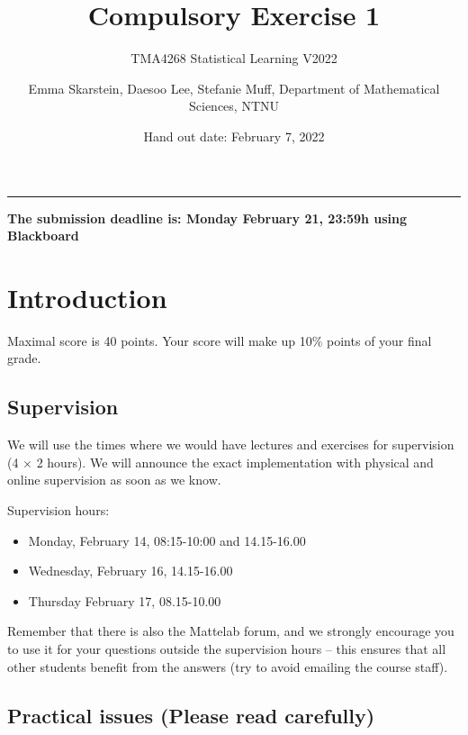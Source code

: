 \documentclass[
]{article}
\title{Compulsory Exercise 1}
\subtitle{TMA4268 Statistical Learning V2022}
\author{Emma Skarstein, Daesoo Lee, Stefanie Muff, Department of
Mathematical Sciences, NTNU}
\date{Hand out date: February 7, 2022}
\providecommand{\tightlist}{%
  \setlength{\itemsep}{0pt}\setlength{\parskip}{0pt}}
\begin{document}
\maketitle

\begin{center}\rule{0.5\linewidth}{0.5pt}\end{center}

\textbf{The submission deadline is: Monday February 21, 23:59h using
Blackboard}

\hypertarget{introduction}{%
\section{Introduction}\label{introduction}}

Maximal score is 40 points. Your score will make up 10\% points of your
final grade.

\hypertarget{supervision}{%
\subsection{Supervision}\label{supervision}}

We will use the times where we would have lectures and exercises for
supervision (4 \(\times\) 2 hours). We will announce the exact
implementation with physical and online supervision as soon as we know.

Supervision hours:

\begin{itemize}
\tightlist
\item
  Monday, February 14, 08:15-10:00 and 14.15-16.00
\item
  Wednesday, February 16, 14.15-16.00
\item
  Thursday February 17, 08.15-10.00
\end{itemize}

Remember that there is also the Mattelab forum, and we strongly
encourage you to use it for your questions outside the supervision hours
-- this ensures that all other students benefit from the answers (try to
avoid emailing the course staff).

\hypertarget{practical-issues-please-read-carefully}{%
\subsection{Practical issues (Please read
carefully)}\label{practical-issues-please-read-carefully}}
\end{document}
